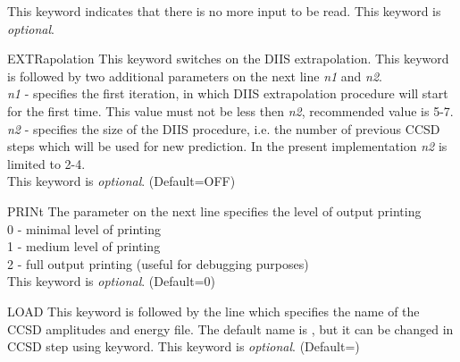 \begin{keywordlist}
This keyword indicates that there is no more input
to be read.
This keyword is {\it optional}.
\item[EXTRapolation]
This keyword switches on the DIIS extrapolation. This keyword is followed
by two additional parameters on the next line {\it n1} and {\it n2}.\\
{\it n1} - specifies the first iteration, in which DIIS extrapolation procedure
will start for the first time. This value must not be less then {\it n2},
recommended
value is 5-7.\\
{\it n2} - specifies the size of the DIIS procedure, i.e. the number of previous
CCSD steps which will be used for new prediction. In the present implementation
{\it n2} is limited to 2-4.\\
This keyword is {\it optional}. (Default=OFF)
\item[PRINt]
The parameter on the next line specifies the level of output printing\\
0 - minimal level of printing\\
1 - medium level of printing\\
2 - full output printing (useful for debugging purposes)\\
This keyword is {\it optional}. (Default=0)
\item[LOAD]
This keyword is followed by the line which specifies the
name of the CCSD amplitudes and energy file. The default name is ,
but it can be changed in CCSD step using  keyword.
This keyword is {\it optional}. (Default=)

\end{keywordlist}
